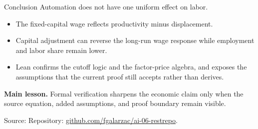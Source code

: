 \documentclass[aspectratio=169,11pt]{beamer}
\newcommand{\source}[1]{\vfill{\tiny\color{navy!70}Source: #1}}
\begin{document}
\begin{frame}{Conclusion}
  \Large
  Automation does not have one uniform effect on labor.

  \medskip
  \normalsize
  \begin{itemize}
    \item The fixed-capital wage reflects productivity minus displacement.
    \item Capital adjustment can reverse the long-run wage response while employment and labor share remain lower.
    \item Lean confirms the cutoff logic and the factor-price algebra, and exposes the assumptions that the current proof still accepts rather than derives.
  \end{itemize}

  \medskip
  \textbf{Main lesson.} Formal verification sharpens the economic claim only
  when the source equation, added assumptions, and proof boundary remain visible.

  \source{Repository: \href{https://github.com/fgalarzac/ai-06-restrepo}{github.com/fgalarzac/ai-06-restrepo}.}
\end{frame}
\end{document}
